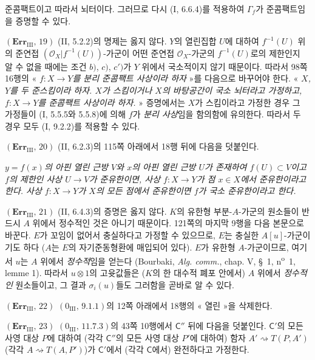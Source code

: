 준콤팩트이고 따라서 뇌터이다. 그러므로 다시 (I, 6.6.4)를 적용하여
$\Gamma_f$가 준콤팩트임을 증명할 수 있다.

\noindent\textbf{$(\mathbf{Err}_{\mathrm{III}},\,19)$}
(II, 5.2.2)의 명제는 옳지 않다. $Y$의 열린집합 $U$에 대하여
$f^{-1}(U)$ 위의 준연접 $(\mathscr O_X|f^{-1}(U))$-가군이 어떤 준연접
$\mathscr O_X$-가군의 $f^{-1}(U)$로의 제한인지 알 수 없을 때에는 조건
$b)$, $c)$, $c')$가 $Y$ 위에서 국소적이지 않기 때문이다. 따라서
98쪽 16행의 « \emph{$f:X\to Y$를 분리 준콤팩트 사상이라 하자} »를
다음으로 바꾸어야 한다. « \emph{$X$, $Y$를 두 준스킴이라 하자.
$X$가 스킴이거나 $X$의 바탕공간이 국소 뇌터라고 가정하고,
$f:X\to Y$를 준콤팩트 사상이라 하자.} » 증명에서는 $X$가 스킴이라고
가정한 경우 그 가정들이 (I, 5.5.5와 5.5.8)에 의해 $f$가
\emph{분리 사상}임을 함의함에 유의한다. 따라서 두 경우 모두
(I, 9.2.2)를 적용할 수 있다.

\noindent\textbf{$(\mathbf{Err}_{\mathrm{III}},\,20)$}
(II, 6.2.3)의 115쪽 아래에서 18행 뒤에 다음을 덧붙인다.

\emph{$y=f(x)$의 아핀 열린 근방 $V$와 $x$의 아핀 열린 근방 $U$가
존재하여 $f(U)\subset V$이고 $f$의 제한인 사상 $U\to V$가 준유한이면,
사상 $f:X\to Y$가 점 $x\in X$에서 준유한이라고 한다. 사상
$f:X\to Y$가 $X$의 모든 점에서 준유한이면 $f$가 국소 준유한이라고
한다.}

\noindent\textbf{$(\mathbf{Err}_{\mathrm{III}},\,21)$}
(II, 6.4.3)의 증명은 옳지 않다. $K$의 유한형 부분-$A$-가군의 원소들이
반드시 $A$ 위에서 정수적인 것은 아니기 때문이다. 121쪽의 마지막
9행을 다음 본문으로 바꾼다. $E$가 꼬임이 없어서 충실하다고 가정할 수
있으므로, $E$는 충실한 $A[u]$-가군이기도 하다 ($A$는 $E$의
자기준동형환에 매입되어 있다). $E$가 유한형 $A$-가군이므로, 여기서
$u$는 $A$ 위에서 \emph{정수적}임을 얻는다 (Bourbaki,
\emph{Alg. comm.}, chap. V, \S~1, n\textsuperscript{o}~1, lemme 1).
따라서 $u\otimes1$의 고윳값들은 ($K$의 한 대수적 폐포 안에서) $A$
위에서 \emph{정수적인} 원소들이고, 그 결과 $\sigma_i(u)$들도 그러함을
곧바로 알 수 있다.

\noindent\textbf{$(\mathbf{Err}_{\mathrm{III}},\,22)$}
$(0_{\mathrm{III}},\,9.1.1)$의 12쪽 아래에서 18행의 « 열린 »을
삭제한다.

\noindent\textbf{$(\mathbf{Err}_{\mathrm{III}},\,23)$}
$(0_{\mathrm{III}},\,11.7.3)$의 43쪽 10행에서 $\mathsf C''$ 뒤에
다음을 덧붙인다. $\mathsf C'$의 모든 사영 대상 $P$에 대하여 (각각
$\mathsf C''$의 모든 사영 대상 $P'$에 대하여) 함자
$A'\rightsquigarrow T(P,A')$ (각각 $A\rightsquigarrow T(A,P')$)가
$\mathsf C'$에서 (각각 $\mathsf C$에서) 완전하다고 가정한다.

